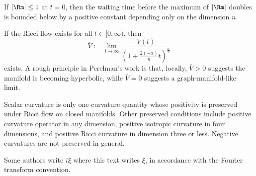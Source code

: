 \begin{remark}
\label{topping-maxpr-curvature-doubling}
If $|\Rm|\le 1$ at $t=0$, then the waiting time before the maximum of $|\Rm|$
doubles is bounded below by a positive constant depending only on the dimension
$n$.
\end{remark}

\begin{remark}
\label{topping-maxpr-perelman-volume}
If the Ricci flow exists for all $t\in[0,\infty)$, then
\[
\overline V:=\lim_{t\to\infty}\frac{V(t)}{\left(1+\frac{2(-\alpha)}{n}t\right)^{\frac n2}}
\]
exists. A rough principle in Perelman's work is that, locally, $\overline V>0$
suggests the manifold is becoming hyperbolic, while $\overline V=0$ suggests a
graph-manifold-like limit.
\end{remark}

\begin{remark}
\label{topping-maxpr-preserved-curvature-conditions}
Scalar curvature is only one curvature quantity whose positivity is preserved
under Ricci flow on closed manifolds. Other preserved conditions include
positive curvature operator in any dimension, positive isotropic curvature in
four dimensions, and positive Ricci curvature in dimension three or less.
Negative curvatures are not preserved in general.
\end{remark}

\begin{remark}
\label{topping-pde-principal-symbol-fourier-convention}
Some authors write $i\xi$ where this text writes $\xi$, in accordance with the
Fourier transform convention.
\end{remark}
